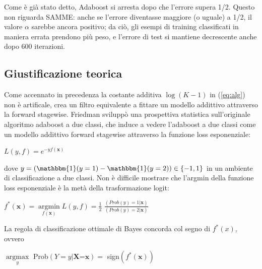 Come \`e gi\`a stato detto, Adaboost si arresta dopo che l'errore supera 1/2. Questo non riguarda SAMME: 
anche se l'errore diventasse maggiore (o uguale) a 1/2, il 
valore \begin{math}\alpha \end{math} sarebbe ancora positivo; 
da ci\`o, gli esempi di training classificati in maniera errata prendono pi\`u peso, 
e l'errore di test si mantiene 
decrescente anche dopo 600 iterazioni. \\
\newline
\subsection{Giustificazione teorica}
Come accennato in precedenza la costante additiva 
\begin{math}\log(K-1)\end{math} in (\ref{eq:alg}) non 
\`e artificale, crea un filtro equivalente a fittare un modello addittivo 
attraverso la forward stagewise. Friedman svilupp\`o una prospettiva statistica sull'originale algoritmo adaboost 
a due classi, che induce a vedere l'adaboost a due classi come un modello addittivo 
forward stagewise attraverso la funzione loss esponenziale:
\begin{center}
\begin{math} L(y,f) = e^{-yf(\textbf{x})} \end{math}
\end{center}
dove \begin{math}y=(\mathbbm{1}(y = 1) - \mathbbm{1}(y = 2))\in \left\{-1,1\right\}\end{math} 
in un ambiente di classificazione a due classi. Non \`e difficile mostrare che l'argmin 
della funzione loss esponenziale \`e la met\`a della trasformazione logit: 
\begin{center}
 \begin{math} f^*(\textbf{x})=\underset{f(\textbf{x})}{\operatorname{argmin}}L(y,f)= 
\frac{1}{2}\end{math}
           \begin{math}\frac{(Prob (y) =1|\textbf{x})}{(Prob (y)=2|\textbf{x})}\end{math}
\end{center}
La regola di classificazione ottimale di Bayes concorda col segno di \begin{math}f^*(x)\end{math}, ovvero
\begin{center}
 \begin{math}
 \underset{y}{\operatorname{argmax}} 
 \end{math} Prob\begin{math}
                 (Y=y | \textbf{X=x}) =
                \end{math} sign\begin{math}
                                (f^*(\textbf{x}))
                               \end{math}



\end{center}


